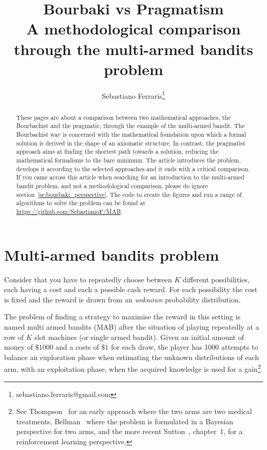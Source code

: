 \documentclass[]{scrartcl}
\title{Bourbaki vs Pragmatism \\ A methodological comparison through the multi-armed bandits problem}
\author{Sebastiano Ferraris\footnote{sebastiano.ferraris@gmail.com}}
\theoremstyle{definition}
\begin{document}
\maketitle

\begin{abstract}
These pages are about a comparison between two mathematical approaches, the Bourbachist and the pragmatic, through the example of the multi-armed bandit. The Bourbachist way is concerned with the mathematical foundation upon which a formal solution is derived in the shape of an axiomatic structure. In contrast, the pragmatist approach aims at finding the shortest path towards a solution, reducing the mathematical formalisms to the bare minimum.
The article introduces the problem, develops it according to the selected approaches and it ends with a critical comparison. \\

\noindent
If you came across this article when searching for an introduction to the multi-armed bandit problem, and not a methodological comparison, please do ignore section~\ref{se:bourbaki_perspective}. The code to create the figures and run a range of algorithms to solve the problem can be found at \href{https://github.com/SebastianoF/multi-armed-bandits-testbed}{https://github.com/SebastianoF/MAB}. 
\end{abstract}


\section{Multi-armed bandits problem}
\label{se:intro}
Consider that you have to repeatedly choose between $K$ different possibilities, each having a cost and each a possible cash reward. For each possibility the cost is fixed and the reward is drawn from an \emph{unknown} probability distribution.

The problem of finding a strategy to maximise the reward in this setting is named multi armed bandits (MAB) after the situation of playing repeatedly at a row of $K$ slot machines (or single armed bandit). Given an initial amount of money of $\$1000$ and a costs of $\$1$ for each draw, the player has 1000 attempts to balance an exploration phase when estimating the unknown distributions of each arm, with an exploitation phase, when the acquired knowledge is used for a gain\footnote{See Thompson~\cite{thompson1933likelihood} for an early approach where the two arms are two medical treatments, Bellman~\cite{bellman1956problem} where the problem is formulated in a Bayesian perspective for two arms, and the more recent Sutton~\cite{sutton2018reinforcement}, chapter~1, for a reinforcement learning perspective.}.
\end{document}
